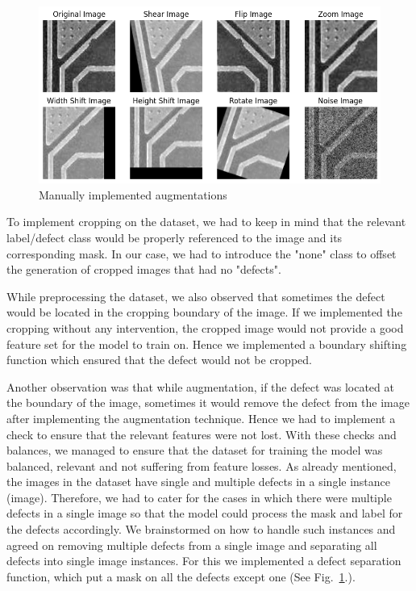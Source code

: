 \documentclass[12pt]{article}
\begin{document}
\begin{figure}[h]
    \centering
    \includegraphics[width=1\textwidth]{./graphics/manual augmentation.png}
    \caption{Manually implemented augmentations}
    \label{fig:manual_augmentation}
\end{figure}


To implement cropping on the dataset, we had to keep in mind that the relevant label/defect class would be properly referenced to the image and its corresponding mask. In our case, we had to introduce the "none" class to offset the generation of cropped images that had no "defects".

While preprocessing the dataset, we also observed that sometimes the defect would be located in the cropping boundary of the image. If we implemented the cropping without any intervention, the cropped image would not provide a good feature set for the model to train on. Hence we implemented a boundary shifting function which ensured that the defect would not be cropped.

Another observation was that while augmentation, if the defect was located at the boundary of the image, sometimes it would remove the defect from the image after implementing the augmentation
technique. Hence we had to implement a check to ensure that the relevant features were not lost. With these checks and balances, we managed to ensure that the dataset for training the model was balanced, relevant and not suffering from feature losses.
As already mentioned, the images in the dataset have single and multiple defects in a single instance (image). Therefore, we had to cater for the cases in which there were multiple defects in a single image so that the model could process the mask and label for the defects accordingly. We brainstormed on how to handle such instances and agreed on removing multiple defects from a single image and separating all defects into single image instances. For this we implemented a defect separation function, which put a mask on all the defects except one (See Fig.~\ref{fig:manual_augmentation}.).
\end{document}
